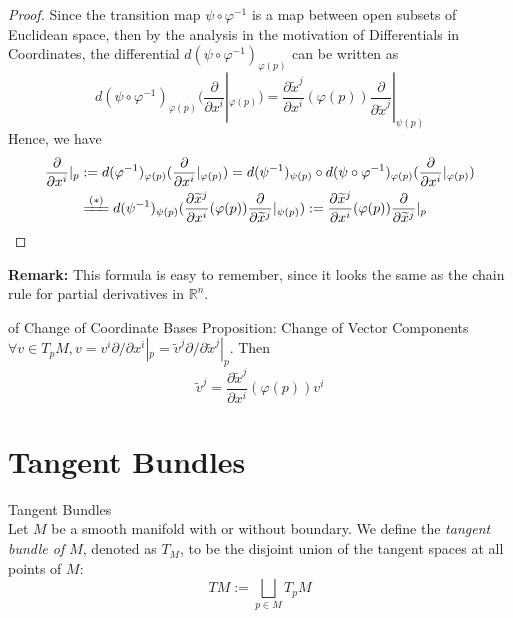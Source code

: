\begin{proof}
    Since the transition map $\psi \circ \varphi^{-1}$ is a map between open subsets of Euclidean space, then by the analysis in the motivation of Differentials in Coordinates, the differential $d(\psi \circ \varphi^{-1})_{\varphi(p)}$ can be written as 
    \begin{equation*}
        d(\psi \circ \varphi^{-1})_{\varphi(p)} (\frac{\partial}{\partial x^i}|_{\varphi(p)})= \frac{\partial \widetilde{x}^j}{\partial x^i} (\varphi(p)) \frac{\partial}{\partial \widetilde{x}^j}|_{\psi (p)} \tag{*}
    \end{equation*}
    Hence, we have
    \begin{align*}
        \frac{\partial}{\partial x^i}|_p&:= d(\varphi^{-1})_{\varphi(p)} (\frac{\partial}{\partial x^i}|_{\varphi(p)})= d(\psi^{-1})_{\psi(p)} \circ d(\psi \circ \varphi^{-1})_{\varphi(p)} (\frac{\partial}{\partial x^i}|_{\varphi(p)})\\
        &\xlongequal{(*)} d(\psi ^{-1})_{\psi(p)} (\frac{\partial \widetilde{x}^j}{\partial x^i}(\varphi(p))\frac{\partial}{\partial \widetilde{x}^j}|_{\psi (p)}) := \frac{\partial \widetilde{x}^j}{\partial x^i} (\varphi(p)) \frac{\partial}{\partial \widetilde{x}^j}|_p
    \end{align*}
\end{proof}

\noindent\textbf{Remark:} This formula is easy to remember, since it looks the same as the chain rule for partial derivatives in $\mathbb{R}^n$.

\begin{corollary}{of Change of Coordinate Bases Proposition: Change of Vector Components}\\
$\forall v\in T_pM, v=v^i \partial/ \partial x^i|_p= \widetilde{v}^j \partial/ \partial \widetilde{x}^j|_p$. Then
\[
\widetilde{v}^j= \frac{\partial \widetilde{x}^j}{\partial x^i} (\varphi(p)) v^i
\]
\end{corollary}

\section{Tangent Bundles}

\begin{definition}{Tangent Bundles}\\
Let $M$ be a smooth manifold with or without boundary. We define the \textit{tangent bundle of $M$}, denoted as $T_M$, to be the disjoint union of the tangent spaces at all points of $M$:
\[
TM:= \bigsqcup_{p\in M} T_pM
\]
\end{definition}

